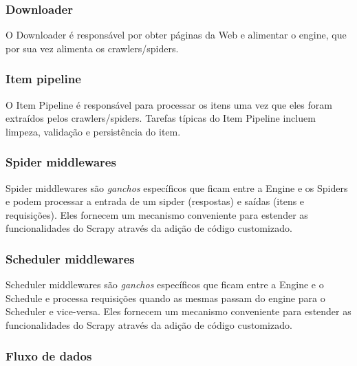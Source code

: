 \subsubsection{Downloader}

O Downloader é responsável por obter páginas da Web e alimentar o engine, que por sua vez alimenta os crawlers/spiders.

\subsubsection{Item pipeline}

O Item Pipeline é responsável para processar os itens uma vez que eles foram extraídos pelos crawlers/spiders. Tarefas típicas do Item Pipeline incluem limpeza, validação e persistência do item.


\subsubsection{Spider middlewares}

Spider middlewares são \emph{ganchos} específicos que ficam entre a Engine e os Spiders e podem processar a entrada de um sipder (respostas) e saídas (itens e requisições). Eles fornecem um mecanismo conveniente para estender as funcionalidades do Scrapy através da adição de código customizado.


\subsubsection{Scheduler middlewares}

Scheduler middlewares são \emph{ganchos} específicos que ficam entre a Engine e o Schedule e processa requisições quando as mesmas passam do engine para o Scheduler e vice-versa. Eles fornecem um mecanismo conveniente para estender as funcionalidades do Scrapy através da adição de código customizado.

\subsubsection{Fluxo de dados}


